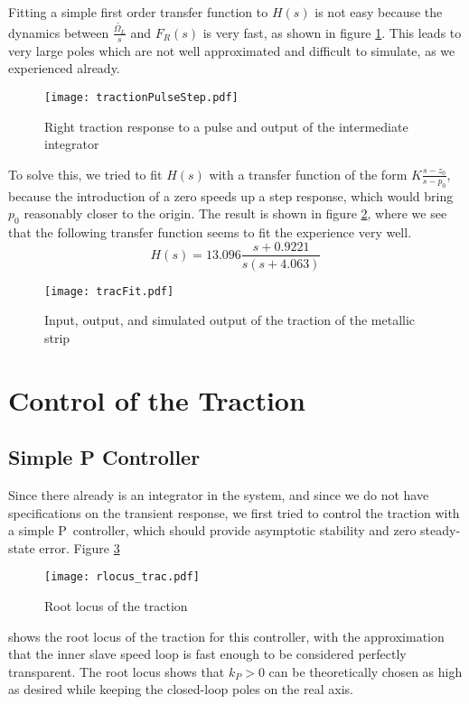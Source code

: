 Fitting a simple first order transfer function to $H(s)$ is not easy because the dynamics between $\frac{\tilde{\Omega_L}}{s}$ and $F_R(s)$ is very fast, as shown in figure \ref{fig:tractionPulseStep}. This leads to very large poles which are not well approximated and difficult to simulate, as we experienced already.
\begin{figure}[htbp]
\centering
\texttt{[image: tractionPulseStep.pdf]}
\caption{Right traction response to a pulse and output of the intermediate integrator\label{fig:tractionPulseStep}}
\end{figure}

To solve this, we tried to fit $H(s)$ with a transfer function of the form $K\frac{s-z_0}{s-p_0}$, because the introduction of a zero speeds up a step response, which would bring $p_0$ reasonably closer to the origin. The result is shown in figure \ref{fig:tracFit}, where we see that the following transfer function seems to fit the experience very well.
\[H(s) = 13.096\frac{s+0.9221}{s(s+4.063)}\]
\begin{figure}[htbp]
\centering
\texttt{[image: tracFit.pdf]}
\caption{Input, output, and simulated output of the traction of the metallic strip\label{fig:tracFit}}
\end{figure}

\section{Control of the Traction}
\subsection{Simple P Controller}
Since there already is an integrator in the system, and since we do not have specifications on the transient response, we first tried to control the traction with a simple P~controller, which should provide asymptotic stability and zero steady-state error. Figure \ref{fig:tracRLocus}
\begin{figure}[htbp]
  \centering
  \texttt{[image: rlocus\_trac.pdf]}
  \caption{Root locus of the traction\label{fig:tracRLocus}}
\end{figure}
shows the root locus of the traction for this controller, with the approximation that the inner slave speed loop is fast enough to be considered perfectly transparent. The root locus shows that $k_P > 0$ can be theoretically chosen as high as desired while keeping the closed-loop poles on the real axis.

